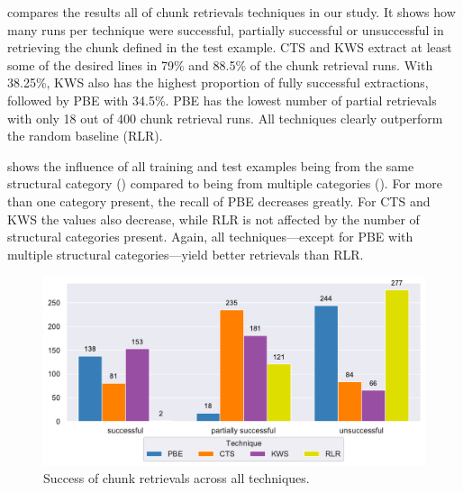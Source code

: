  compares the results all of chunk
retrievals techniques in our study.
It shows how many runs per technique were successful, partially
successful or unsuccessful in retrieving the chunk defined in the
test example.
CTS and KWS
extract at least some of the desired lines in 79\% and 88.5\%
of the chunk retrieval runs.
With 38.25\%, KWS also has the highest proportion of fully
successful extractions, followed by PBE with 34.5\%.
PBE has the
lowest number of partial retrievals with only 18 out of 400 chunk
retrieval runs.
All techniques clearly outperform the random baseline (RLR).

shows the influence of all training and test examples being from the
same structural category
()
compared to being from multiple categories
().
For more
than one category present, the recall of PBE decreases greatly.
For CTS and KWS the values also decrease, while RLR is not affected by
the number of structural categories present.
Again, all techniques---except for PBE with multiple structural
categories---yield better retrievals than RLR.

\begin{figure}[!t]
		\centering
		\includegraphics[width=\columnwidth,
		clip]{img/big-study/success-partial-all.pdf}
		\caption{Success of chunk retrievals across all
		techniques.}
		\label{fig:success-partial-all}
\end{figure}

